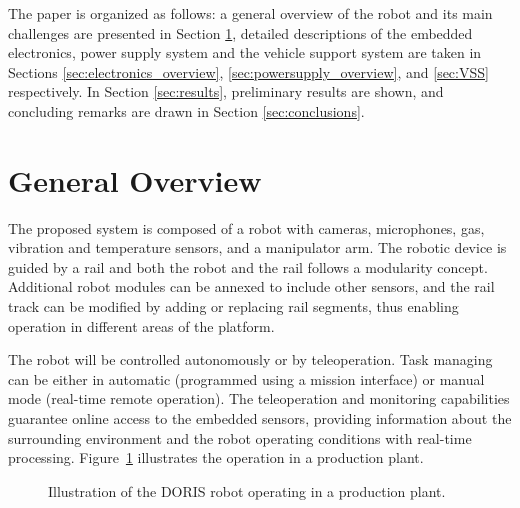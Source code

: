 \documentclass{ifacconf}
\begin{document}
The paper is organized as follows: a general overview of the robot and its main
challenges are presented in Section \ref{sec:general_overview}, detailed
descriptions of the embedded electronics, power
supply system and the vehicle support system are taken in
Sections \ref{sec:electronics_overview}, \ref{sec:powersupply_overview}, and
\ref{sec:VSS} respectively.
In Section \ref{sec:results}, preliminary results are shown, and concluding
remarks are drawn in Section \ref{sec:conclusions}. 

\section{General Overview}\label{sec:general_overview}

The proposed system is composed of a robot with cameras, microphones, gas,
vibration and temperature sensors, and a manipulator arm. The robotic device is
guided by a rail and both the robot and the rail follows a modularity concept.
Additional robot modules can be annexed to include other sensors, and the rail
track can be modified by adding or replacing rail segments, thus enabling
operation in different areas of the platform.

The robot will be controlled autonomously or by teleoperation. Task managing
can be either in automatic (programmed using a mission interface) or manual
mode (real-time remote operation). The teleoperation and monitoring
capabilities guarantee online access to the embedded sensors, providing
information about the surrounding environment and the robot operating
conditions with real-time processing. Figure~\ref{fig:DORIS-overview}
illustrates the operation in a production plant.

\begin{figure}[ht] 
\centering
{} 
\vspace{-.1cm}
\caption{Illustration of the DORIS robot operating in a production plant.}\vspace{-0.25cm}
\label{fig:DORIS-overview}
\end{figure}
\end{document}
